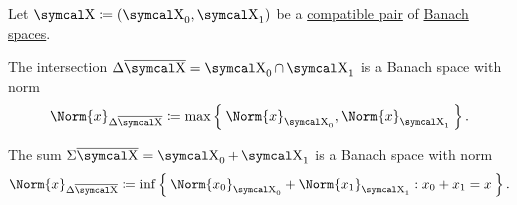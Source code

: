 \begin{proposition}\label{def:banach_space_sum_and_intersection_norms}
  Let \( \CX \coloneqq (\CX_0, \CX_1) \) be a \hyperref[def:interpolated_topological_vector_space/compatibility]{compatible pair} of \hyperref[def:banach_space]{Banach spaces}.

  \begin{PropEnum}
     The intersection \( \Delta \Ol{\CX} = \CX_0 \cap \CX_1 \) is a Banach space with norm
    \begin{equation}\label{eq:def:banach_space_sum_and_intersection_norms/intersection}
      \Norm{x}_{\Delta \Ol{\CX}} \coloneqq \max \Set{ \Norm{x}_{\CX_0}, \Norm{x}_{\CX_1} }.
    \end{equation}

     The sum \( \Sigma \Ol{\CX} = \CX_0 + \CX_1 \) is a Banach space with norm
    \begin{equation}\label{eq:def:banach_space_sum_and_intersection_norms/sum}
      \Norm{x}_{\Delta \Ol{\CX}} \coloneqq \inf \Set{ \Norm{x_0}_{\CX_0} + \Norm{x_1}_{\CX_1} : x_0 + x_1 = x }.
    \end{equation}
  \end{PropEnum}
\end{proposition}
